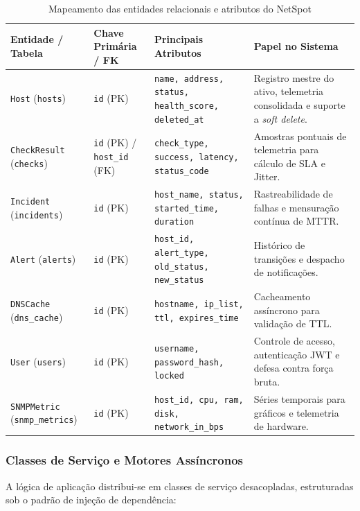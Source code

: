 \documentclass[12pt,a4paper]{article}
\newcommand{\fonte}[1]{\par\vspace{-0.5em}{\small Fonte: #1}\par}
\begin{document}
\begin{table}[H]
\centering
\caption{Mapeamento das entidades relacionais e atributos do NetSpot}
\label{tab:entidades_relacionais}
\small
\begin{tabular}{@{}p{2.8cm}p{3.2cm}p{3.0cm}p{6.0cm}@{}}
\toprule
\textbf{Entidade / Tabela} & \textbf{Chave Primária / FK} & \textbf{Principais Atributos} & \textbf{Papel no Sistema} \\
\midrule
\texttt{Host} (\texttt{hosts}) & \texttt{id} (PK) & \texttt{name, address, status, health\_score, deleted\_at} & Registro mestre do ativo, telemetria consolidada e suporte a \textit{soft delete}. \\
\texttt{CheckResult} (\texttt{checks}) & \texttt{id} (PK) / \texttt{host\_id} (FK) & \texttt{check\_type, success, latency, status\_code} & Amostras pontuais de telemetria para cálculo de SLA e Jitter. \\
\texttt{Incident} (\texttt{incidents}) & \texttt{id} (PK) & \texttt{host\_name, status, started\_time, duration} & Rastreabilidade de falhas e mensuração contínua de MTTR. \\
\texttt{Alert} (\texttt{alerts}) & \texttt{id} (PK) & \texttt{host\_id, alert\_type, old\_status, new\_status} & Histórico de transições e despacho de notificações. \\
\texttt{DNSCache} (\texttt{dns\_cache}) & \texttt{id} (PK) & \texttt{hostname, ip\_list, ttl, expires\_time} & Cacheamento assíncrono para validação de TTL. \\
\texttt{User} (\texttt{users}) & \texttt{id} (PK) & \texttt{username, password\_hash, locked} & Controle de acesso, autenticação JWT e defesa contra força bruta. \\
\texttt{SNMPMetric} (\texttt{snmp\_metrics}) & \texttt{id} (PK) & \texttt{host\_id, cpu, ram, disk, network\_in\_bps} & Séries temporais para gráficos e telemetria de hardware. \\
\bottomrule
\end{tabular}
\fonte{Autoria própria (2026).}
\end{table}

\subsubsection{Classes de Serviço e Motores Assíncronos}
A lógica de aplicação distribui-se em classes de serviço desacopladas, estruturadas sob o padrão de injeção de dependência:
\end{document}
